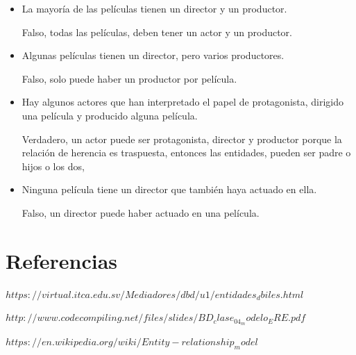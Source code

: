 \documentclass{article}
\begin{document}
\begin{itemize}
    \par\null\par Verdadero, un productor podría ser director también,
    \item La mayoría de las películas tienen un director y un productor.
    \par\null\par
    Falso, todas las películas, deben tener un actor y un productor.
    \item Algunas películas tienen un director, pero varios productores.
    \par\null\par
    Falso, solo puede haber un productor por película.
    \item Hay algunos actores que han interpretado el papel de protagonista, dirigido una película y
    producido alguna película.
    \par\null\par
    Verdadero, un actor puede ser protagonista, director y productor porque la relación de herencia es traspuesta, entonces las entidades, pueden ser padre o hijos o los dos,
    \item Ninguna película tiene un director que también haya actuado en ella.
    \par\null\par
    Falso, un director puede haber actuado en una película.
\end{itemize}
\section{Referencias}
\textbf{$https://virtual.itca.edu.sv/Mediadores/dbd/u1/entidades_dbiles.html$}\par\null\par
\textbf{$http://www.codecompiling.net/files/slides/BD_clase_04_modelo_ERE.pdf$}\par\null\par
\textbf{$https://en.wikipedia.org/wiki/Entity-relationship_model$}
 
\end{document}

